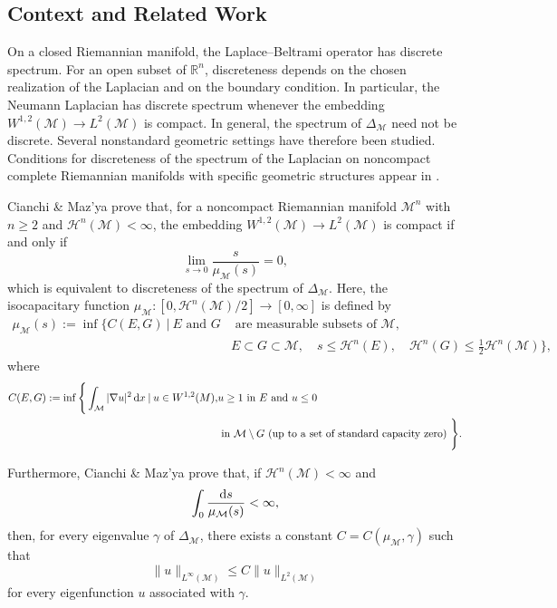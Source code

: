 \documentclass[reqno, 11pt, a4paper]{amsart}
\numberwithin{equation}{section}
\newcommand{\dx}{\textnormal{d}x}
\begin{document}
\subsection{Context and Related Work}

{On a closed Riemannian manifold, the Laplace--Beltrami operator has discrete spectrum. For an open subset of $\mathbb R^n$, discreteness depends on the chosen realization of the Laplacian and on the boundary condition. In particular, the Neumann Laplacian has discrete spectrum whenever the embedding $W^{1,2}(\mathcal M)\rightarrow L^2(\mathcal M)$ is compact.}
In general, the spectrum of $\Delta_{\mathcal M}$ need not be discrete. Several nonstandard geometric settings have therefore been studied. Conditions for discreteness of the spectrum of the Laplacian on noncompact complete Riemannian manifolds with specific geometric structures appear in \cite{baider1979discretespectra, brooks1984fiitevolume, bruning1989discretespectrum, donnelly1979purepointspectrum, escobar1986spectrum, kleine1988discretenessconditions}.

Cianchi \& Maz'ya \cite{cianchi2011spectrumnoncomriem} prove that, for a noncompact Riemannian manifold $\mathcal M^n$ with $n\geq2$ and $\mathcal H^n(\mathcal M)<\infty$, the embedding $W^{1,2}(\mathcal M)\rightarrow L^2(\mathcal M)$ is compact if and only if
$$
\lim_{s\rightarrow0}\frac{s}{\mu_{\mathcal M}(s)}=0,
$$
which is equivalent to discreteness of the spectrum of $\Delta_{\mathcal M}$. Here, the isocapacitary function $\mu_{\mathcal M}:[0,\mathcal H^n(\mathcal M)/2]\rightarrow[0,\infty]$ is defined by
\begin{align*}
\mu_{\mathcal M}(s):=\inf\Big\{C(E,G)\:|\: E \text { and } G & \text { are measurable subsets of } \mathcal M,\\
& E\subset G\subset\mathcal M,\quad s\leq\mathcal H^n(E),\quad \mathcal H^n(G)\leq\frac12\mathcal H^n(\mathcal M)\Big\},
\end{align*}
where
\begin{align*}
  C(E, G):=\inf \Bigg\{  \int_{\mathcal M}|\nabla u|^2 \, \dx \:|\: u \in W^{1,2}(M), & u \geq 1  \text  { in } E \text  {  and }  u \leq 0\\
  & \text { in }  \mathcal M \setminus G \text  { (up to a set of standard capacity zero) }\Bigg\}.
  \end{align*}


Furthermore, Cianchi \& Maz'ya \cite{cianchi2013boundseigenfunctions} prove that, if $\mathcal H^n(\mathcal M)<\infty$ and
$$
\int_0\frac{\textnormal{d}s}{\mu_{\mathcal M}(s)}<\infty,
$$
then, for every eigenvalue $\gamma$ of $\Delta_{\mathcal M}$, there exists a constant $C=C(\mu_{\mathcal M},\gamma)$ such that
$$
\|u\|_{L^\infty(\mathcal M)}\leq C\|u\|_{L^2(\mathcal M)}
$$
for every eigenfunction $u$ associated with $\gamma$.
\end{document}
